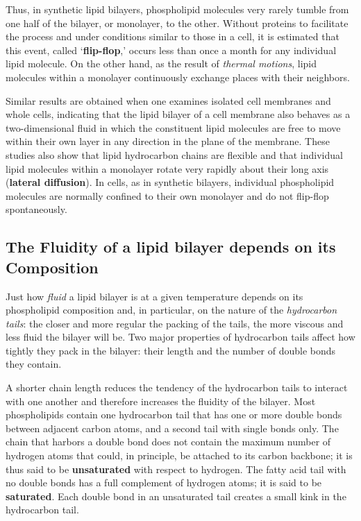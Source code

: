 Thus, in synthetic lipid bilayers, phospholipid molecules very rarely tumble from one half of the bilayer,
or monolayer, to the other. Without proteins to facilitate the process
and under conditions similar to those in a cell, it is estimated that this
event, called ‘\textbf{flip-flop},’ occurs less than once a month for any individual
lipid molecule. On the other hand, as the result of \textit{thermal motions}, lipid
molecules within a monolayer continuously exchange places with their neighbors.

Similar results are obtained when one examines isolated cell membranes
and whole cells, indicating that the lipid bilayer of a cell membrane
also behaves as a two-dimensional fluid in which the constituent lipid
molecules are free to move within their own layer in any direction in the
plane of the membrane. These studies also show that lipid hydrocarbon
chains are flexible and that individual lipid molecules within a monolayer
rotate very rapidly about their long axis (\textbf{lateral diffusion}). In cells, as in synthetic bilayers,
individual phospholipid molecules are normally confined to their own
monolayer and do not flip-flop spontaneously.

\subsection{The Fluidity of a lipid bilayer depends on its Composition}

Just how \textit{fluid} a lipid
bilayer is at a given temperature depends on its phospholipid composition
and, in particular, on the nature of the \textit{hydrocarbon tails}: the closer
and more regular the packing of the tails, the more viscous and less fluid
the bilayer will be. Two major properties of hydrocarbon tails affect how
tightly they pack in the bilayer: their length and the number of double
bonds they contain.

A shorter chain length reduces the tendency of the hydrocarbon tails
to interact with one another and therefore increases the fluidity of the
bilayer.
Most phospholipids contain one hydrocarbon tail that has one or more
double bonds between adjacent carbon atoms, and a second tail with
single bonds only. The chain that harbors a double bond
does not contain the maximum number of hydrogen atoms that could, in
principle, be attached to its carbon backbone; it is thus said to be \textbf{unsaturated}
with respect to hydrogen. The fatty acid tail with no double bonds
has a full complement of hydrogen atoms; it is said to be \textbf{saturated}. Each
double bond in an unsaturated tail creates a small kink in the hydrocarbon tail.

